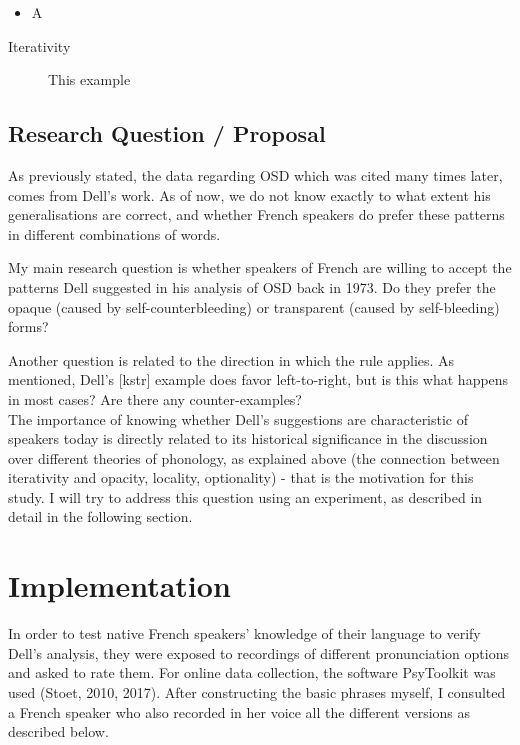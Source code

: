 \documentclass{article}
\begin{document}
\begin{itemize}
  \item A
\end{itemize}

\begin{description}
   \item[Iterativity] This example
\end{description}

\subsection{Research Question / Proposal} %
As previously stated, the data regarding OSD which was cited many times later, comes from Dell's work. As of now, we do not know exactly to what extent his generalisations are correct, and whether French speakers do prefer these patterns in different combinations of words.

My main research question is whether speakers of French are willing to accept the patterns Dell suggested in his analysis of OSD back in 1973.  Do they prefer the opaque (caused by self-counterbleeding) or transparent (caused by self-bleeding) forms?

Another question is related to the direction in which the rule applies. As mentioned,  Dell's [kstr] example does favor left-to-right, but is this what happens in most cases? Are there any counter-examples?\\

The importance of knowing whether Dell's suggestions are characteristic of speakers today is directly related to its historical significance in the discussion over different theories of phonology,  as explained above (the connection between iterativity and opacity, locality, optionality) - that is the motivation for this study. I will try to address this question using an experiment, as described in detail in the following section.

\clearpage
\section{Implementation} 
In order to test native French speakers' knowledge of their language to verify Dell's analysis, they were exposed to recordings of different pronunciation options and asked to rate them.  For online data collection,  the software PsyToolkit was used (Stoet, 2010, 2017). After constructing the basic phrases myself, I consulted a French speaker who also recorded in her voice all the different versions as described below. 
\end{document}
